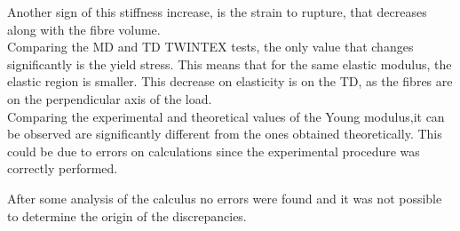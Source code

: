 Another sign of this stiffness increase, is the strain to rupture, that decreases along with the fibre volume.\\

Comparing the MD and TD TWINTEX tests, the only value that changes significantly is the yield stress. This means that for the same elastic modulus, the elastic region is smaller. This decrease on elasticity is on the TD, as the fibres are on the perpendicular axis of the load.\\

Comparing the experimental and theoretical values of the Young modulus,it can be observed are significantly different from the ones obtained theoretically. This could be due to errors on calculations since the experimental procedure was correctly performed.

After some analysis of the calculus no errors were found and it was not possible to determine the origin of the discrepancies.
